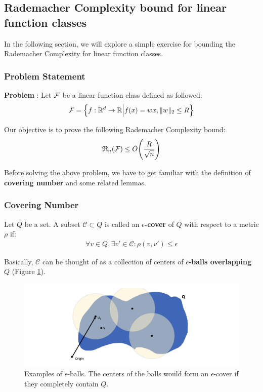 \subsection{Rademacher Complexity bound for linear function classes}
In the following section, we will explore a simple exercise for bounding the Rademacher Complexity for linear function classes.

\subsubsection{Problem Statement}
\label{sec:rc_bound_lin_func_problem}

\textbf{Problem} : Let $\mathcal{F}$ be a linear function class defined as followed:
\begin{align*}
    \mathcal{F} = \Big\{ 
        f:\mathbb{R}^d \to \mathbb{R} \Big| f(x) = wx, \|w\|_2 \le R
     \Big\}
\end{align*}

\noindent Our objective is to prove the following Rademacher Complexity bound:
\begin{align*}
    \mathfrak{R}_n(\mathcal{F}) \le \tilde O \Bigg( 
        \frac{R}{\sqrt{n}}
     \Bigg)
\end{align*}

\noindent Before solving the above problem, we have to get familiar with the definition of \textbf{covering number} and some related lemmas.


\subsubsection{Covering Number}
\begin{definition}
    Let $Q$ be a set. A subset $\mathcal{C}\subset Q$ is called an \textbf{$\epsilon$-cover} of $Q$ with respect to a metric $\rho$ if:
    \begin{align*}
        \forall v \in Q, \exists v'\in \mathcal{C} : \rho(v, v') \le \epsilon
    \end{align*}

    \noindent Basically, $\mathcal{C}$ can be thought of as a collection of centers of \textbf{$\epsilon$-balls overlapping $Q$} (Figure \ref{fig:epsilon_cover}).
\end{definition}

\begin{figure}[ht]
    \centering
    \includegraphics[width=\textwidth]{figures/epsilon_cover.png}
    \caption{Examples of $\epsilon$-balls. The centers of the balls would form an $\epsilon$-cover if they completely contain $Q$.}
    \label{fig:epsilon_cover}
\end{figure}

